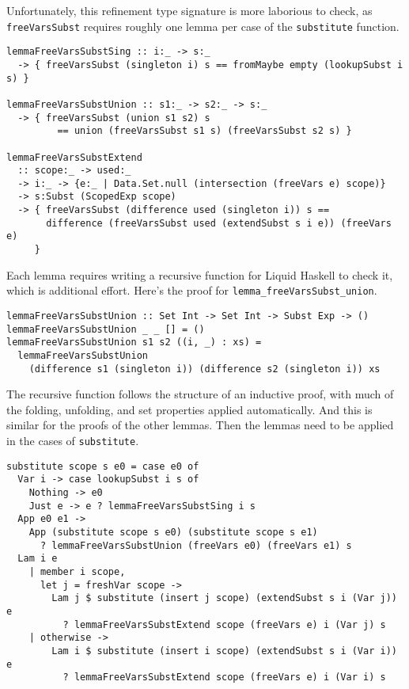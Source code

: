 \documentclass[sigconf, anonymous, review]{acmart}
\newcommand{\tc}[1]{{\small\texttt{#1}}}
\begin{document}
Unfortunately, this refinement type signature is more laborious to check, as
\tc{free\-Vars\-Subst} requires roughly one lemma per case of the \tc{subs\-ti\-tute}
function.

\begin{verbatim}
lemmaFreeVarsSubstSing :: i:_ -> s:_
  -> { freeVarsSubst (singleton i) s == fromMaybe empty (lookupSubst i s) }

lemmaFreeVarsSubstUnion :: s1:_ -> s2:_ -> s:_
  -> { freeVarsSubst (union s1 s2) s
         == union (freeVarsSubst s1 s) (freeVarsSubst s2 s) }

lemmaFreeVarsSubstExtend
  :: scope:_ -> used:_
  -> i:_ -> {e:_ | Data.Set.null (intersection (freeVars e) scope)}
  -> s:Subst (ScopedExp scope)
  -> { freeVarsSubst (difference used (singleton i)) s ==
       difference (freeVarsSubst used (extendSubst s i e)) (freeVars e)
     }
\end{verbatim}

Each lemma requires writing a recursive function for Liquid Haskell to
check it, which is additional effort. Here's the proof for
\tc{lemma\_free\-Vars\-Subst\_union}.

\begin{verbatim}
lemmaFreeVarsSubstUnion :: Set Int -> Set Int -> Subst Exp -> ()
lemmaFreeVarsSubstUnion _ _ [] = ()
lemmaFreeVarsSubstUnion s1 s2 ((i, _) : xs) =
  lemmaFreeVarsSubstUnion
    (difference s1 (singleton i)) (difference s2 (singleton i)) xs
\end{verbatim}

The recursive function follows the structure of an inductive proof,
with much of the folding, unfolding, and set properties applied
automatically. And this is similar for the proofs of the other lemmas.
Then the lemmas need to be applied in the cases of \tc{substitute}.

\begin{verbatim}
substitute scope s e0 = case e0 of
  Var i -> case lookupSubst i s of
    Nothing -> e0
    Just e -> e ? lemmaFreeVarsSubstSing i s
  App e0 e1 ->
    App (substitute scope s e0) (substitute scope s e1)
      ? lemmaFreeVarsSubstUnion (freeVars e0) (freeVars e1) s
  Lam i e
    | member i scope,
      let j = freshVar scope ->
        Lam j $ substitute (insert j scope) (extendSubst s i (Var j)) e
          ? lemmaFreeVarsSubstExtend scope (freeVars e) i (Var j) s
    | otherwise ->
        Lam i $ substitute (insert i scope) (extendSubst s i (Var i)) e
          ? lemmaFreeVarsSubstExtend scope (freeVars e) i (Var i) s
\end{verbatim}
\end{document}
